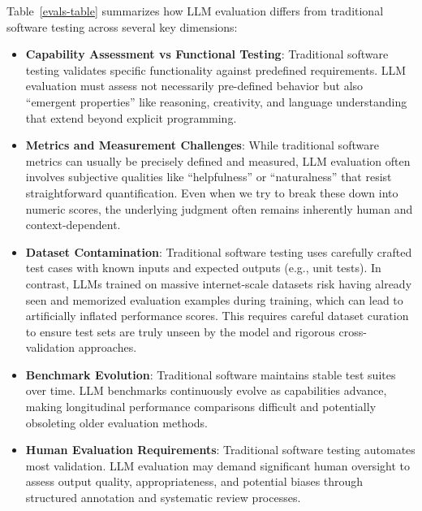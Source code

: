 Table~\ref{evals-table} summarizes how LLM evaluation differs from traditional software testing across several key dimensions:
\begin{itemize}
    \item \textbf{Capability Assessment vs Functional Testing}: Traditional software testing validates specific functionality against predefined requirements. LLM evaluation must assess not necessarily pre-defined behavior but also ``emergent properties'' like reasoning, creativity, and language understanding that extend beyond explicit programming.

    \item \textbf{Metrics and Measurement Challenges}: While traditional software metrics can usually be precisely defined and measured, LLM evaluation often involves subjective qualities like ``helpfulness'' or ``naturalness'' that resist straightforward quantification. Even when we try to break these down into numeric scores, the underlying judgment often remains inherently human and context-dependent.

    \item \textbf{Dataset Contamination}: Traditional software testing uses carefully crafted test cases with known inputs and expected outputs (e.g., unit tests). In contrast, LLMs trained on massive internet-scale datasets risk having already seen and memorized evaluation examples during training, which can lead to artificially inflated performance scores. This requires careful dataset curation to ensure test sets are truly unseen by the model and rigorous cross-validation approaches.

    \item \textbf{Benchmark Evolution}: Traditional software maintains stable test suites over time. LLM benchmarks continuously evolve as capabilities advance, making longitudinal performance comparisons difficult and potentially obsoleting older evaluation methods.

    \item \textbf{Human Evaluation Requirements}: Traditional software testing automates most validation. LLM evaluation may demand significant human oversight to assess output quality, appropriateness, and potential biases through structured annotation and systematic review processes.
\end{itemize}


